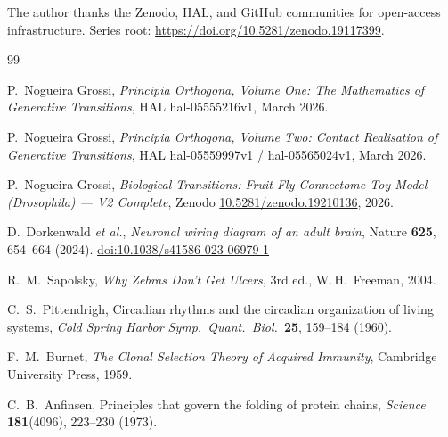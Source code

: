 \documentclass[12pt,a4paper]{article}
\begin{document}
The author thanks the Zenodo, HAL, and GitHub communities for open-access
infrastructure.  Series root:
\url{https://doi.org/10.5281/zenodo.19117399}.

\begin{thebibliography}{99}

P.~Nogueira Grossi,
\emph{Principia Orthogona, Volume One: The Mathematics of Generative
Transitions},
HAL hal-05555216v1, March 2026.

P.~Nogueira Grossi,
\emph{Principia Orthogona, Volume Two: Contact Realisation of Generative
Transitions},
HAL hal-05559997v1 / hal-05565024v1, March 2026.

P.~Nogueira Grossi,
\emph{Biological Transitions: Fruit-Fly Connectome Toy Model (Drosophila) ---
V2 Complete},
Zenodo \href{https://doi.org/10.5281/zenodo.19210136}{10.5281/zenodo.19210136},
2026.

D.~Dorkenwald \emph{et al.},
\emph{Neuronal wiring diagram of an adult brain},
Nature \textbf{625}, 654--664 (2024).
\href{https://doi.org/10.1038/s41586-023-06979-1}{doi:10.1038/s41586-023-06979-1}

R.~M.~Sapolsky,
\emph{Why Zebras Don't Get Ulcers},
3rd ed., W.\,H.~Freeman, 2004.

C.~S.~Pittendrigh,
Circadian rhythms and the circadian organization of living systems,
\emph{Cold Spring Harbor Symp.\ Quant.\ Biol.}\ \textbf{25}, 159--184 (1960).

F.~M.~Burnet,
\emph{The Clonal Selection Theory of Acquired Immunity},
Cambridge University Press, 1959.

C.~B.~Anfinsen,
Principles that govern the folding of protein chains,
\emph{Science} \textbf{181}(4096), 223--230 (1973).

\end{thebibliography}
\end{document}
